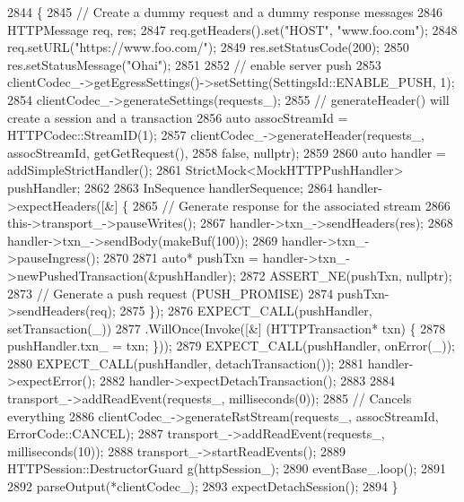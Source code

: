 \begin{DoxyCode}
2844                                                           \{
2845   \textcolor{comment}{// Create a dummy request and a dummy response messages}
2846   HTTPMessage req, res;
2847   req.getHeaders().set(\textcolor{stringliteral}{"HOST"}, \textcolor{stringliteral}{"www.foo.com"});
2848   req.setURL(\textcolor{stringliteral}{"https://www.foo.com/"});
2849   res.setStatusCode(200);
2850   res.setStatusMessage(\textcolor{stringliteral}{"Ohai"});
2851 
2852   \textcolor{comment}{// enable server push}
2853   clientCodec\_->getEgressSettings()->setSetting(SettingsId::ENABLE\_PUSH, 1);
2854   clientCodec\_->generateSettings(requests\_);
2855   \textcolor{comment}{// generateHeader() will create a session and a transaction}
2856   \textcolor{keyword}{auto} assocStreamId = HTTPCodec::StreamID(1);
2857   clientCodec\_->generateHeader(requests\_, assocStreamId, getGetRequest(),
2858                                \textcolor{keyword}{false}, \textcolor{keyword}{nullptr});
2859 
2860   \textcolor{keyword}{auto} handler = addSimpleStrictHandler();
2861   StrictMock<MockHTTPPushHandler> pushHandler;
2862 
2863   InSequence handlerSequence;
2864   handler->expectHeaders([&] \{
2865       \textcolor{comment}{// Generate response for the associated stream}
2866       this->transport\_->pauseWrites();
2867       handler->txn\_->sendHeaders(res);
2868       handler->txn\_->sendBody(makeBuf(100));
2869       handler->txn\_->pauseIngress();
2870 
2871       \textcolor{keyword}{auto}* pushTxn = handler->txn\_->newPushedTransaction(&pushHandler);
2872       ASSERT\_NE(pushTxn, \textcolor{keyword}{nullptr});
2873       \textcolor{comment}{// Generate a push request (PUSH\_PROMISE)}
2874       pushTxn->sendHeaders(req);
2875     \});
2876   EXPECT\_CALL(pushHandler, setTransaction(\_))
2877     .WillOnce(Invoke([&] (HTTPTransaction* txn) \{
2878           pushHandler.txn\_ = txn; \}));
2879   EXPECT\_CALL(pushHandler, onError(\_));
2880   EXPECT\_CALL(pushHandler, detachTransaction());
2881   handler->expectError();
2882   handler->expectDetachTransaction();
2883 
2884   transport\_->addReadEvent(requests\_, milliseconds(0));
2885   \textcolor{comment}{// Cancels everything}
2886   clientCodec\_->generateRstStream(requests\_, assocStreamId, ErrorCode::CANCEL);
2887   transport\_->addReadEvent(requests\_, milliseconds(10));
2888   transport\_->startReadEvents();
2889   HTTPSession::DestructorGuard g(httpSession\_);
2890   eventBase\_.loop();
2891 
2892   parseOutput(*clientCodec\_);
2893   expectDetachSession();
2894 \}
\end{DoxyCode}
